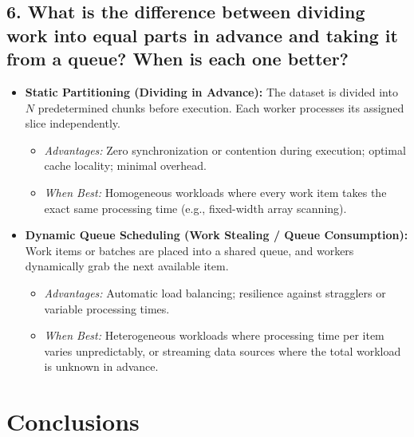 \documentclass[12pt,a4paper]{article}
\begin{document}
\subsection{6. What is the difference between dividing work into equal parts in advance and taking it from a queue? When is each one better?}
\begin{itemize}
    \item \textbf{Static Partitioning (Dividing in Advance):} The dataset is divided into $N$ predetermined chunks before execution. Each worker processes its assigned slice independently.
    \begin{itemize}
        \item \textit{Advantages:} Zero synchronization or contention during execution; optimal cache locality; minimal overhead.
        \item \textit{When Best:} Homogeneous workloads where every work item takes the exact same processing time (e.g., fixed-width array scanning).
    \end{itemize}
    \item \textbf{Dynamic Queue Scheduling (Work Stealing / Queue Consumption):} Work items or batches are placed into a shared queue, and workers dynamically grab the next available item.
    \begin{itemize}
        \item \textit{Advantages:} Automatic load balancing; resilience against stragglers or variable processing times.
        \item \textit{When Best:} Heterogeneous workloads where processing time per item varies unpredictably, or streaming data sources where the total workload is unknown in advance.
    \end{itemize}
\end{itemize}

\section{Conclusions}
\end{document}
